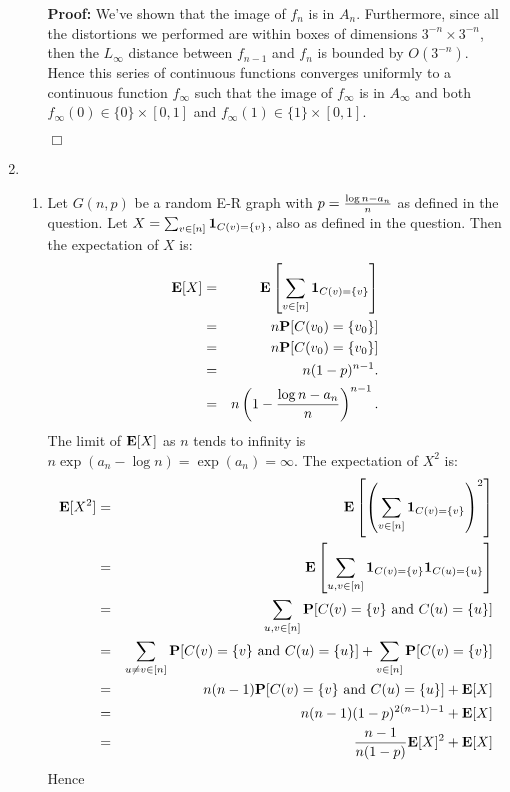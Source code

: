 \documentclass[11pt]{article} \usepackage{amssymb}
\newenvironment{proof}{\noindent \textbf{Proof:}}{$\Box$}
\newcommand{\E}{{\bf E}} \newcommand{\Cov}{{\bf Cov}}
\begin{document}
\begin{enumerate}
\begin{enumerate}
\begin{proof}
        We've shown that the image of $f_n$ is in $A_n$. Furthermore, 
        since all the distortions we performed are within boxes of dimensions
        $3^{-n}\times 3^{-n}$, then the $L_\infty$ distance between $f_{n-1}$ and
        $f_n$ is bounded by $O(3^{-n})$. Hence this series of continuous functions
        converges uniformly to a continuous function $f_\infty$ such that the 
        image of $f_\infty$ is in
        $A_\infty$ and both $f_\infty(0)\in\{0\}\times [0,1]$ and 
        $f_\infty(1)\in\{1\}\times [0,1]$.
        
      \end{proof}
    \end{enumerate}
  \item
    \begin{enumerate}
    \item 
      Let $G(n,p)$ be a random E-R graph with $p={\log n-a_n\over n}$ as defined
      in the question. Let $X=\sum_{v\in[n]}{\bf 1}_{C(v)=\{v\}}$, also as defined
      in the question. Then the expectation of $X$ is:
      \begin{eqnarray*}
        \E[X] &=& \E\left[\sum_{v\in[n]}{\bf 1}_{C(v)=\{v\}}\right]
        \\ &=& n\P[C(v_0)=\{v_0\}]
        \\ &=& n\P[C(v_0)=\{v_0\}]
        \\ &=& n(1-p)^{n-1}.
        \\ &=& n\left(1-{\log n-a_n\over n}\right)^{n-1}.
      \end{eqnarray*}
      The limit of $\E[X]$ as $n$ tends to infinity is 
      $n\exp(a_n-\log n)=\exp(a_n)=\infty$.
      The expectation of $X^2$ is:
      \begin{eqnarray*}
        \E[X^2] &=& \E\left[\left(\sum_{v\in[n]}{\bf 1}_{C(v)=\{v\}}\right)^2\right]
        \\ &=& \E\left[\sum_{u,v\in[n]}{\bf 1}_{C(v)=\{v\}}{\bf 1}_{C(u)=\{u\}}\right]
        \\ &=& \sum_{u,v\in[n]}\P[C(v)=\{v\} \mbox{ and } C(u)=\{u\}]
        \\ &=& \sum_{u\neq v\in[n]}\P[C(v)=\{v\} \mbox{ and } C(u)=\{u\}]+\sum_{v\in[n]}\P[C(v)=\{v\}]
        \\ &=& n(n-1)\P[C(v)=\{v\} \mbox{ and } C(u)=\{u\}]+\E[X]
        \\ &=& n(n-1)(1-p)^{2(n-1)-1}+\E[X]
        \\ &=& {n-1\over n(1-p)}\E[X]^2+\E[X]
      \end{eqnarray*}
      Hence

\end{enumerate}
\end{enumerate}
\end{document}
